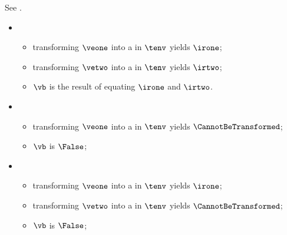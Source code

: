 See .

\ProseParagraph
\OneApplies
\begin{itemize}
  \item {}
  \begin{itemize}
    \item transforming $\veone$ into a \symbolicexpressionterm{} in $\tenv$ yields $\irone$\ProseOrTypeError;
    \item transforming $\vetwo$ into a \symbolicexpressionterm{} in $\tenv$ yields $\irtwo$\ProseOrTypeError;
    \item $\vb$ is the result of equating $\irone$ and $\irtwo$.
  \end{itemize}

  \item {}
  \begin{itemize}
    \item transforming $\veone$ into a \symbolicexpressionterm{} in $\tenv$ yields $\CannotBeTransformed$;
    \item $\vb$ is $\False$;
  \end{itemize}

  \item {}
  \begin{itemize}
    \item transforming $\veone$ into a \symbolicexpressionterm{} in $\tenv$ yields $\irone$;
    \item transforming $\vetwo$ into a \symbolicexpressionterm{} in $\tenv$ yields $\CannotBeTransformed$;
    \item $\vb$ is $\False$;
  \end{itemize}
\end{itemize}

\FormallyParagraph
{}

